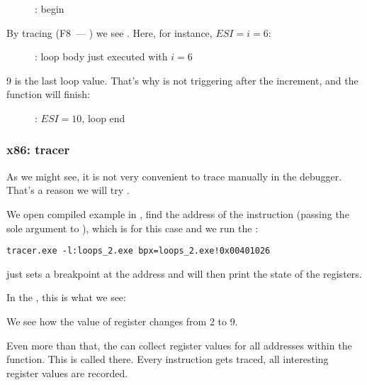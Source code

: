 \begin{figure}[H]
\centering
{}
\caption{\olly: \main begin}
\label{fig:loops_olly_1}
\end{figure}

By tracing (F8~--- \stepover) we see \ESI 
{}.
Here, for instance, $ESI=i=6$:

\begin{figure}[H]
\centering
{}
\caption{\olly: loop body just executed with $i=6$}
\label{fig:loops_olly_2}
\end{figure}

9 is the last loop value.
That's why \JL is not triggering after the \gls{increment}, and the function will finish:

\begin{figure}[H]
\centering
{}
\caption{\olly: $ESI=10$, loop end}
\label{fig:loops_olly_3}
\end{figure}

\subsubsection{x86: tracer}

As we might see, it is not very convenient to trace manually in the debugger.
That's a reason we will try \tracer.

We open compiled example in \IDA, find the address of the instruction 
(passing the sole argument to \ttf), which is  for this case and we run the \tracer:

\begin{lstlisting}
tracer.exe -l:loops_2.exe bpx=loops_2.exe!0x00401026
\end{lstlisting}

 just sets a breakpoint at the address and \tracer will then print the state of the registers.

In the , this is what we see:



We see how the value of \ESI register changes from 2 to 9.

Even more than that, the \tracer can collect register values for all addresses within the function.
This is called  there.
Every instruction gets traced, all interesting register values are recorded.

